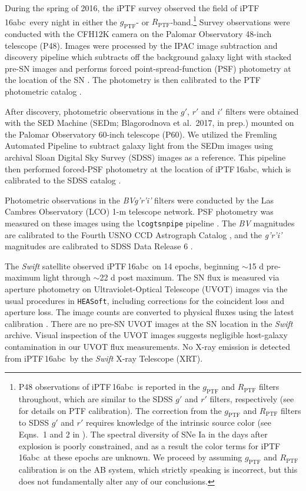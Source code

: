 \documentclass[twocolumn]{aastex61}
\newcommand{\abc}{iPTF\,16abc}
\begin{document}
During the spring of 2016, the iPTF survey observed the field of \abc\ every night in either the $g_\mathrm{PTF}$- or 
$R_\mathrm{PTF}$-band.\footnote{P48 observations of \abc\ is reported in the $g_\mathrm{PTF}$ and $R_\mathrm{PTF}$ filters throughout, which are similar to the SDSS $g'$ and $r'$ filters, respectively (see \citealt{2012PASP..124..854O} for details on PTF calibration). The correction from the $g_\mathrm{PTF}$ and $R_\mathrm{PTF}$ filters to SDSS $g'$ and $r'$ requires knowledge of the intrinsic source color (see Eqns.~1 and 2 in \citealt{2012PASP..124..854O}). The spectral diversity of SNe Ia in the days after explosion is poorly constrained, and as a result the color terms for \abc\ at these epochs are unknown. We proceed by assuming $g_\mathrm{PTF}$ and $R_\mathrm{PTF}$ calibration is on the AB system, which strictly speaking is incorrect, but this does not fundamentally alter any of our conclusions.} 
Survey observations were conducted with the
CFH12K camera \citep{2000SPIE.3965...58S} on the Palomar Observatory 
48-inch telescope (P48). Images were processed by the IPAC image
subtraction and discovery pipeline which subtracts off the background
galaxy light with stacked pre-SN images and performs forced
point-spread-function (PSF) photometry at the location of the SN 
\citep{2017PASP..129a4002M}. The
photometry is then calibrated to the PTF photometric catalog
\citep{2012PASP..124..854O}.

After discovery, photometric observations in the $g'$, $r'$ and $i'$
filters were obtained with the SED Machine 
(SEDm; Blagorodnova et al.\ 2017, in prep.) mounted on the Palomar Observatory 
60-inch telescope (P60). We utilized the Fremling Automated Pipeline \citep{2016A&A...593A..68F} to subtract galaxy light from the SEDm images using archival Sloan Digital Sky Survey (SDSS) images as a reference. This pipeline then performed forced-PSF photometry at the location of \abc, which is calibrated to the SDSS catalog \citep{2014ApJS..211...17A}.

Photometric observations in the \textit{BVg'r'i'} filters were conducted by the Las Cambres Observatory (LCO) 1-m
telescope network.  PSF photometry was measured on these images using
the \texttt{lcogtsnpipe} pipeline \citep{2016MNRAS.459.3939V}. The
\textit{BV} magnitudes are calibrated to the Fourth USNO CCD
Astrograph Catalog \citep{2013AJ....145...44Z}, and the \textit{g'r'i'}
magnitudes are calibrated to SDSS Data Release 6
\citep{2008ApJS..175..297A}.

The \textit{Swift} satellite observed \abc\ on 14 epochs, beginning 
$\sim$15 d pre-maximum light through $\sim$22 d post maximum. The SN 
flux is measured via aperture photometry on Ultraviolet-Optical
Telescope (UVOT) images via the usual procedures in 
\texttt{HEASoft}, including corrections for the coincident loss and 
aperture loss. The image counts
are converted to physical fluxes using the latest calibration
\citep{2011AIPC.1358..373B}. There are no pre-SN UVOT images at the 
SN location in the \textit{Swift} archive.  Visual inspection of the
UVOT images suggests negligible host-galaxy contamination in our 
UVOT flux measurements. No X-ray emission is detected from \abc\ by the \textit{Swift} X-ray Telescope (XRT).
\end{document}
